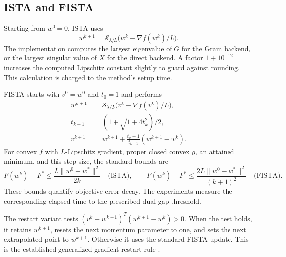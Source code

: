 \documentclass{article}
\newcommand{\soft}{\mathcal{S}}
\begin{document}
\subsection{ISTA and FISTA}
Starting from $w^0=0$, ISTA uses
\begin{equation}
 w^{k+1}=\soft_{\lambda/L}\bigl(w^k-\nabla f(w^k)/L\bigr).
\end{equation}
The implementation computes the largest eigenvalue of $G$ for the Gram backend, or the largest singular value of $X$ for the direct backend. A factor $1+10^{-12}$ increases the computed Lipschitz constant slightly to guard against rounding. This calculation is charged to the method's setup time.

FISTA starts with $v^0=w^0$ and $t_0=1$ and performs
\begin{align}
 w^{k+1}&=\soft_{\lambda/L}\bigl(v^k-\nabla f(v^k)/L\bigr),\\
 t_{k+1}&=(1+\sqrt{1+4t_k^2})/2,\\
 v^{k+1}&=w^{k+1}+\frac{t_k-1}{t_{k+1}}(w^{k+1}-w^k).
\end{align}
For convex $f$ with $L$-Lipschitz gradient, proper closed convex $g$, an attained minimum, and this step size, the standard bounds are
\begin{equation}
 F(w^k)-F^*\leq\frac{L\|w^0-w^*\|^2}{2k}\quad\text{(ISTA)},\qquad
 F(w^k)-F^*\leq\frac{2L\|w^0-w^*\|^2}{(k+1)^2}\quad\text{(FISTA)}.
\end{equation}
These bounds quantify objective-error decay. The experiments measure the corresponding elapsed time to the prescribed dual-gap threshold.

The restart variant tests $(v^k-w^{k+1})^T(w^{k+1}-w^k)>0$. When the test holds, it retains $w^{k+1}$, resets the next momentum parameter to one, and sets the next extrapolated point to $w^{k+1}$. Otherwise it uses the standard FISTA update. This is the established generalized-gradient restart rule \citep{odonoghue2015}.
\end{document}

